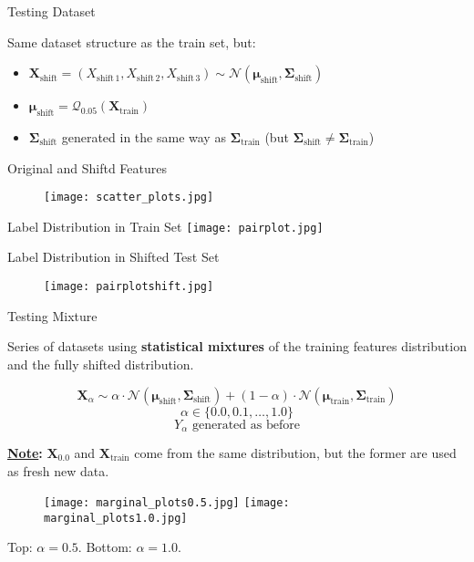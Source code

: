 \begin{frame}{Testing Dataset}

    Same dataset structure as the train set, but:
    \begin{itemize}
        \item $ \boldsymbol{X}_{\text{shift}} = (X_{\text{shift}\,1}, X_{\text{shift}\,2}, X_{\text{shift}\,3}) \sim \mathcal{N}(\boldsymbol{\mu}_{\text{shift}}, \boldsymbol{\Sigma}_{\text{shift}}) $
        \item $ \boldsymbol{\mu}_{\text{shift}} = \mathcal{Q}_{0.05}(\boldsymbol{X}_{\text{train}})$
        \item $\boldsymbol{\Sigma}_{\text{shift}}$ generated in the same way as $\boldsymbol{\Sigma}_{\text{train}}$ (but $\boldsymbol{\Sigma}_{\text{shift}}\neq\boldsymbol{\Sigma}_{\text{train}}$)
    \end{itemize}
    
\end{frame}

\begin{frame}{Original and Shiftd Features}
    \begin{figure}
        \centering
        \texttt{[image: scatter\_plots.jpg]}
    \end{figure}
\end{frame}

\begin{frame}{Label Distribution in Train Set} 
    \vfill
    \centering
    \texttt{[image: pairplot.jpg]}
    \vfill

\end{frame}

\begin{frame}{Label Distribution in Shifted Test Set}
    \begin{figure}
        \centering
        \vfill
        \texttt{[image: pairplotshift.jpg]}
    \end{figure}
\end{frame}

\begin{frame}{Testing Mixture}
    
    Series of datasets using \textbf{statistical mixtures} of the training features distribution and the fully shifted distribution.

    $$
    \boldsymbol{X}_\alpha \sim \alpha\cdot\mathcal{N}(\boldsymbol{\mu}_{\text{shift}}, \boldsymbol{\Sigma}_{\text{shift}}) + (1-\alpha)\cdot\mathcal{N}(\boldsymbol{\mu}_{\text{train}}, \boldsymbol{\Sigma}_{\text{train}})
    $$
    $$
    \alpha \in \{0.0, 0.1, \dots, 1.0\}
    $$
    $$
    Y_\alpha \text{ generated as before}
    $$

    \textbf{\underline{Note}:} $\boldsymbol{X}_{0.0}$ and $\boldsymbol{X}_{\text{train}}$ come from the same distribution, but the former are used as fresh new data.

\end{frame}

\begin{frame}
    \vfill
    \begin{figure}
        \centering
        \texttt{[image: marginal\_plots0.5.jpg]}
        \texttt{[image: marginal\_plots1.0.jpg]}
    \end{figure}
    Top: $\alpha=0.5$. Bottom: $\alpha=1.0$.
\end{frame}

